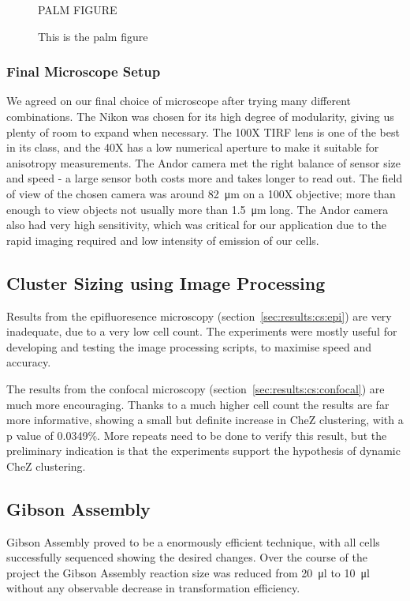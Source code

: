 \documentclass[../main.tex]{subfiles}
\begin{document}
\begin{figure}[h!]
PALM FIGURE
\caption{This is the palm figure}
\end{figure}

\subsubsection{Final Microscope Setup}

We agreed on our final choice of microscope after trying many different combinations. The Nikon was chosen for its high degree of modularity, giving us plenty of room to expand when necessary. The 100X TIRF lens is one of the best in its class, and the 40X has a low numerical aperture to make it suitable for anisotropy measurements\cite{lakowicz}. The Andor camera met the right balance of sensor size and speed - a large sensor both costs more and takes longer to read out. The field of view of the chosen camera was around \SI{82}{\micro\meter} on a 100X objective; more than enough to view objects not usually more than \SI{1.5}{\micro\meter} long. The Andor camera also had very high sensitivity, which was critical for our application due to the rapid imaging required and low intensity of emission of our cells.

\subsection{Cluster Sizing using Image Processing}

Results from the epifluoresence microscopy (section~\ref{sec:results:cs:epi}) are very inadequate, due to a very low cell count. The experiments were mostly useful for developing and testing the image processing scripts, to maximise speed and accuracy.

The results from the confocal microscopy (section~\ref{sec:results:cs:confocal}) are much more encouraging. Thanks to a much higher cell count the results are far more informative, showing a small but definite increase in CheZ clustering, with a p value of 0.0349\%. More repeats need to be done to verify this result, but the preliminary indication is that the experiments support the hypothesis of dynamic CheZ clustering.

\subsection{Gibson Assembly}
Gibson Assembly proved to be a enormously efficient technique, with all cells successfully sequenced showing the desired changes. Over the course of the project the Gibson Assembly reaction size was reduced from \SI{20}{\micro\litre} to \SI{10}{\micro\litre} without any observable decrease in transformation efficiency. 
\end{document}

